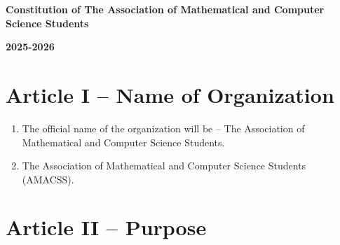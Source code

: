 \documentclass[12pt,a4paper]{article}
\begin{document}
\begin{center}
{\Large\textbf{Constitution of The Association of Mathematical and Computer Science Students}}

\vspace{0.5cm}
{\large\textbf{2025-2026}}
\end{center}

\vspace{1cm}

\section*{Article I – Name of Organization}

\begin{enumerate}
\item The official name of the organization will be – The Association of Mathematical and Computer Science Students.

\item The Association of Mathematical and Computer Science Students (AMACSS).
\end{enumerate}

\section*{Article II – Purpose}
\end{document}
